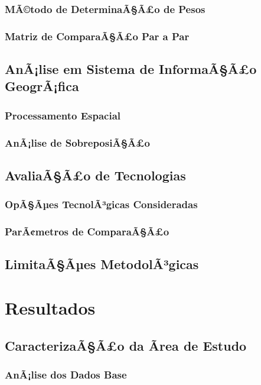 \documentclass[12pt, a4paper]{article}
\begin{document}
\subsubsection{MÃ©todo de DeterminaÃ§Ã£o de Pesos}
\subsubsection{Matriz de ComparaÃ§Ã£o Par a Par}

\subsection{AnÃ¡lise em Sistema de InformaÃ§Ã£o GeogrÃ¡fica}
\subsubsection{Processamento Espacial}
\subsubsection{AnÃ¡lise de SobreposiÃ§Ã£o}

\subsection{AvaliaÃ§Ã£o de Tecnologias}
\subsubsection{OpÃ§Ãµes TecnolÃ³gicas Consideradas}
\subsubsection{ParÃ¢metros de ComparaÃ§Ã£o}

\subsection{LimitaÃ§Ãµes MetodolÃ³gicas}

\section{Resultados}
\subsection{CaracterizaÃ§Ã£o da Ãrea de Estudo}
\subsubsection{AnÃ¡lise dos Dados Base}
\end{document}
